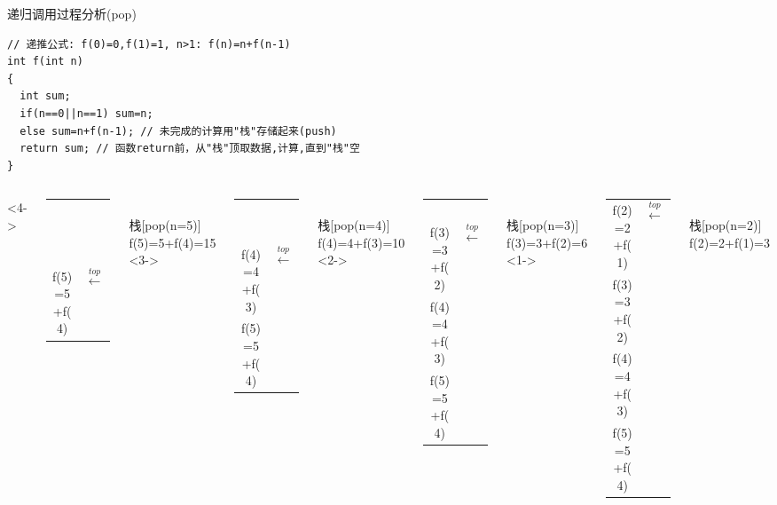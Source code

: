 \begin{frame}{递归调用过程分析(pop)}
\vspace{-0.3cm}
\begin{lstlisting}
// 递推公式: f(0)=0,f(1)=1, n>1: f(n)=n+f(n-1)
int f(int n) 
{
  int sum;
  if(n==0||n==1) sum=n;
  else sum=n+f(n-1); // 未完成的计算用"栈"存储起来(push)
  return sum; // 函数return前，从"栈"顶取数据,计算,直到"栈"空
}
\end{lstlisting}
\vspace{-0.3cm}
\begin{columns}[T]
	<4->
	\begin{tabular}{|c|l}
		\cline{1-1}
		~&\\
		\cline{1-1}
		~&\\
		\cline{1-1}
		~&\\ 
		\cellcolor{yellow}f(5)=5+f(4) & $\xleftarrow{top}$\\ 
		\cline{1-1} 
	\end{tabular}\\ 
	栈[pop(n=5)]\\
	f(5)=5+f(4)=15
	<3->
	\begin{tabular}{|c|l}
		\cline{1-1}
		~&\\
		\cline{1-1}
		~&\\
		\cline{1-1} 
		\cellcolor{yellow}f(4)=4+f(3) & $\xleftarrow{top}$ \\ 
		\cline{1-1} 
		f(5)=5+f(4) & \\ 
		\cline{1-1} 
	\end{tabular}\\ 
	栈[pop(n=4)]\\
	f(4)=4+f(3)=10
	<2->
	\begin{tabular}{|c|l}
		\cline{1-1}
		~&\\ 
		\cellcolor{yellow}f(3)=3+f(2) & $\xleftarrow{top}$ \\ 
		\cline{1-1} 
		f(4)=4+f(3) & \\ 
		\cline{1-1} 
		f(5)=5+f(4) & \\ 
		\cline{1-1} 
	\end{tabular}\\ 
	栈[pop(n=3)]\\
	f(3)=3+f(2)=6
	<1->
	\begin{tabular}{|c|l}
		\cline{1-1} 
		\cellcolor{yellow}f(2)=2+f(1) & $\xleftarrow{top}$ \\ 
		\cline{1-1} 
		f(3)=3+f(2) &\\ 
		\cline{1-1} 
		f(4)=4+f(3) & \\ 
		\cline{1-1} 
		f(5)=5+f(4) &\\ 
		\cline{1-1} 
	\end{tabular}\\ 
	栈[pop(n=2)]\\
	f(2)=2+f(1)=3
\end{columns}
~\\
\end{frame}

